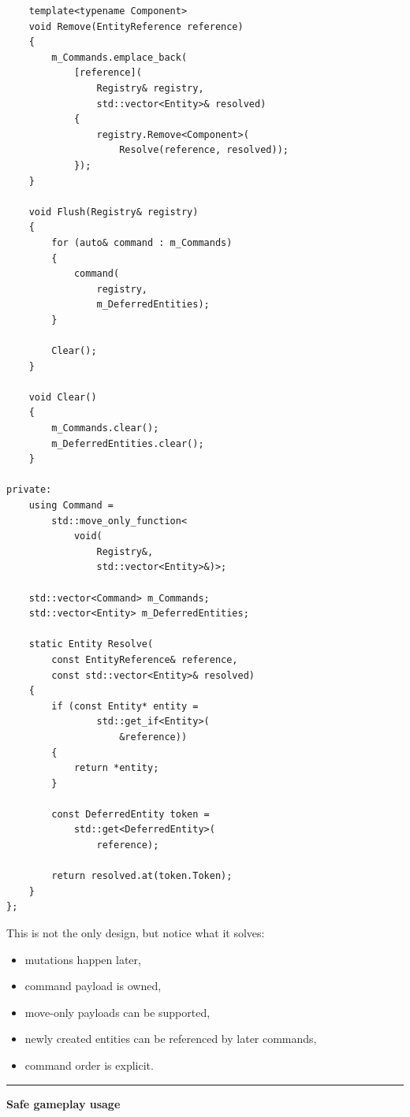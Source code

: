 \begin{verbatim}
    template<typename Component>
    void Remove(EntityReference reference)
    {
        m_Commands.emplace_back(
            [reference](
                Registry& registry,
                std::vector<Entity>& resolved)
            {
                registry.Remove<Component>(
                    Resolve(reference, resolved));
            });
    }

    void Flush(Registry& registry)
    {
        for (auto& command : m_Commands)
        {
            command(
                registry,
                m_DeferredEntities);
        }

        Clear();
    }

    void Clear()
    {
        m_Commands.clear();
        m_DeferredEntities.clear();
    }

private:
    using Command =
        std::move_only_function<
            void(
                Registry&,
                std::vector<Entity>&)>;

    std::vector<Command> m_Commands;
    std::vector<Entity> m_DeferredEntities;

    static Entity Resolve(
        const EntityReference& reference,
        const std::vector<Entity>& resolved)
    {
        if (const Entity* entity =
                std::get_if<Entity>(
                    &reference))
        {
            return *entity;
        }

        const DeferredEntity token =
            std::get<DeferredEntity>(
                reference);

        return resolved.at(token.Token);
    }
};
\end{verbatim}

This is not the only design, but notice what it solves:

\begin{itemize}
\tightlist
\item
  mutations happen later,
\item
  command payload is owned,
\item
  move-only payloads can be supported,
\item
  newly created entities can be referenced by later commands,
\item
  command order is explicit.
\end{itemize}

\begin{center}\rule{0.5\linewidth}{0.5pt}\end{center}

\textbf{Safe gameplay usage}

